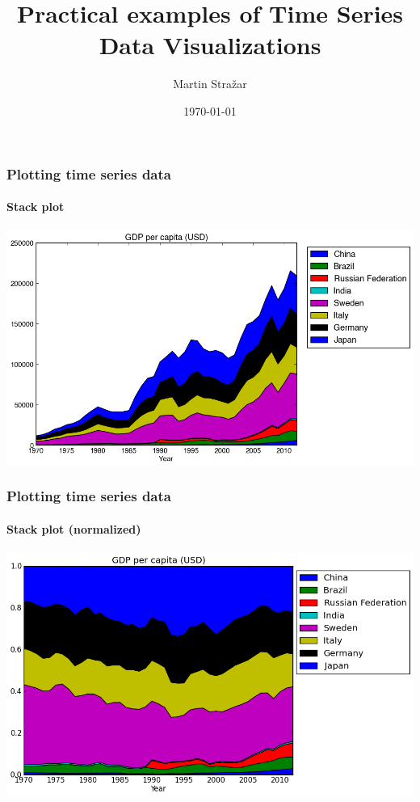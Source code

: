 \documentclass{beamer}
\begin{document}
  
\title[Crisis] %
{Practical examples of Time Series Data Visualizations}

\author[Author, Anders] %
{Martin Stražar}
\date[KPT 2004] %
{\today}

\maketitle

\begin{frame}
	\frametitle{Plotting time series data}
	\framesubtitle{Stack plot}
	\includegraphics[scale=0.4]{../results/gdp.png}
\end{frame}

\begin{frame}
	\frametitle{Plotting time series data}
	\framesubtitle{Stack plot (normalized)}
	\includegraphics[scale=0.5]{../results/gdpn.png}
\end{frame}
 
\end{document}

